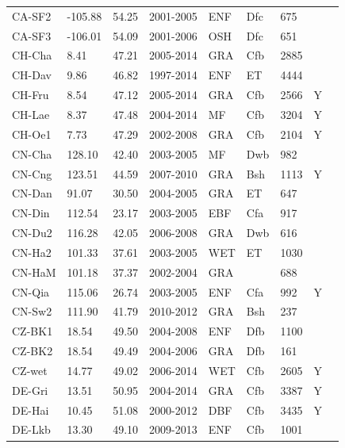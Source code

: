 \documentclass{myreport}
\begin{document}
\begin{longtable}{lllllllll}
  CA-SF2 & -105.88 & 54.25 & 2001-2005 & ENF & Dfc & 675 &  & \citet{CA-SF2} \\ 
  CA-SF3 & -106.01 & 54.09 & 2001-2006 & OSH & Dfc & 651 &  & \citet{CA-SF3} \\ 
  CH-Cha & 8.41 & 47.21 & 2005-2014 & GRA & Cfb & 2885 &  & \citet{CH-Cha} \\ 
  CH-Dav & 9.86 & 46.82 & 1997-2014 & ENF & ET & 4444 &  & \citet{CH-Dav} \\ 
  CH-Fru & 8.54 & 47.12 & 2005-2014 & GRA & Cfb & 2566 & Y & \citet{CH-Fru} \\ 
  CH-Lae & 8.37 & 47.48 & 2004-2014 & MF & Cfb & 3204 & Y & \citet{CH-Lae} \\ 
  CH-Oe1 & 7.73 & 47.29 & 2002-2008 & GRA & Cfb & 2104 & Y & \citet{CH-Oe1} \\ 
  CN-Cha & 128.10 & 42.40 & 2003-2005 & MF & Dwb & 982 &  & \citet{CN-Cha} \\ 
  CN-Cng & 123.51 & 44.59 & 2007-2010 & GRA & Bsh & 1113 & Y & \citet{CN-Cng} \\ 
  CN-Dan & 91.07 & 30.50 & 2004-2005 & GRA & ET & 647 &  & \citet{CN-Dan} \\ 
  CN-Din & 112.54 & 23.17 & 2003-2005 & EBF & Cfa & 917 &  & \citet{CN-Din} \\ 
  CN-Du2 & 116.28 & 42.05 & 2006-2008 & GRA & Dwb & 616 &  & \citet{CN-Du2} \\ 
  CN-Ha2 & 101.33 & 37.61 & 2003-2005 & WET & ET & 1030 &  & \citet{CN-Ha2} \\ 
  CN-HaM & 101.18 & 37.37 & 2002-2004 & GRA &  & 688 &  & \citet{CN-HaM} \\ 
  CN-Qia & 115.06 & 26.74 & 2003-2005 & ENF & Cfa & 992 & Y & \citet{CN-Qia} \\ 
  CN-Sw2 & 111.90 & 41.79 & 2010-2012 & GRA & Bsh & 237 &  & \citet{CN-Sw2} \\ 
  CZ-BK1 & 18.54 & 49.50 & 2004-2008 & ENF & Dfb & 1100 &  & \citet{CZ-BK1} \\ 
  CZ-BK2 & 18.54 & 49.49 & 2004-2006 & GRA & Dfb & 161 &  & \citet{CZ-BK2} \\ 
  CZ-wet & 14.77 & 49.02 & 2006-2014 & WET & Cfb & 2605 & Y & \citet{CZ-wet} \\ 
  DE-Gri & 13.51 & 50.95 & 2004-2014 & GRA & Cfb & 3387 & Y & \citet{DE-Gri} \\ 
  DE-Hai & 10.45 & 51.08 & 2000-2012 & DBF & Cfb & 3435 & Y & \citet{DE-Hai} \\ 
  DE-Lkb & 13.30 & 49.10 & 2009-2013 & ENF & Cfb & 1001 &  & \citet{DE-Lkb} \\ 

\end{longtable}
\end{document}
